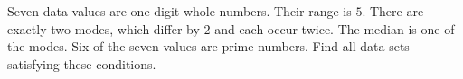 Seven data values are one-digit whole numbers. Their range is $5$. There are exactly two modes, which differ by $2$ and each occur twice. The median is one of the modes. Six of the seven values are prime numbers. Find all data sets satisfying these conditions.
